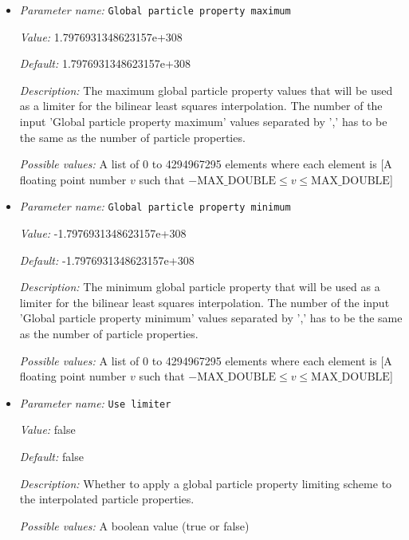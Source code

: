 \begin{itemize}
\item {\it Parameter name:} {\tt Global particle property maximum}
\label{parameters:Postprocess/Particles/Interpolator/Bilinear least squares/Global particle property maximum}


{\it Value:} 1.7976931348623157e+308


{\it Default:} 1.7976931348623157e+308


{\it Description:} The maximum global particle property values that will be used as a limiter for the bilinear least squares interpolation. The number of the input 'Global particle property maximum' values separated by ',' has to be the same as the number of particle properties.


{\it Possible values:} A list of 0 to 4294967295 elements where each element is [A floating point number $v$ such that $-\text{MAX\_DOUBLE} \leq v \leq \text{MAX\_DOUBLE}$]
\item {\it Parameter name:} {\tt Global particle property minimum}
\label{parameters:Postprocess/Particles/Interpolator/Bilinear least squares/Global particle property minimum}


{\it Value:} -1.7976931348623157e+308


{\it Default:} -1.7976931348623157e+308


{\it Description:} The minimum global particle property that will be used as a limiter for the bilinear least squares interpolation. The number of the input 'Global particle property minimum' values separated by ',' has to be the same as the number of particle properties.


{\it Possible values:} A list of 0 to 4294967295 elements where each element is [A floating point number $v$ such that $-\text{MAX\_DOUBLE} \leq v \leq \text{MAX\_DOUBLE}$]
\item {\it Parameter name:} {\tt Use limiter}
\label{parameters:Postprocess/Particles/Interpolator/Bilinear least squares/Use limiter}


{\it Value:} false


{\it Default:} false


{\it Description:} Whether to apply a global particle property limiting scheme to the interpolated particle properties.


{\it Possible values:} A boolean value (true or false)
\end{itemize}

